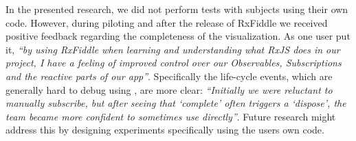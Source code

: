 In the presented research, we did not perform tests with subjects using
their own code.  However, during piloting and after the release of
RxFiddle we received positive feedback regarding the completeness of the
visualization.  As one user put it, \emph{``by using RxFiddle when
learning and understanding what RxJS does in our project, I have a
feeling of improved control over our Observables, Subscriptions and the
reactive parts of our app''}.  Specifically the life-cycle events, which
are generally hard to debug using \printfdebugging{}, are more clear:
\emph{``Initially we were reluctant to manually subscribe, but after
seeing that `complete' often triggers a `dispose', the team became more
confident to sometimes use  directly''}.  Future
research might address this by designing experiments specifically using
the users own code.


